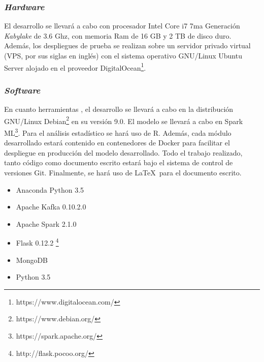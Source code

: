 \subsubsection*{\textit{Hardware}}
El desarrollo se llevará a cabo con procesador Intel Core i7 7ma Generación \textit{Kabylake} de 3.6 Ghz, con memoria Ram de 16 GB y 2 TB de disco duro. Además, los despliegues de prueba se realizan sobre un servidor privado virtual (VPS, por sus siglas en inglés) con el sistema operativo GNU/Linux Ubuntu Server alojado en el proveedor DigitalOcean\footnote{https://www.digitalocean.com/}.

\subsubsection*{\textit{Software}}
En cuanto herramientas , el desarrollo se llevará a cabo en la distribución GNU/Linux Debian\footnote{https://www.debian.org/} en su versión 9.0. El modelo se llevará a cabo en Spark ML\footnote{https://spark.apache.org/}. Para el análisis estadístico se hará uso de R. Además, cada módulo desarrollado estará contenido en contenedores de Docker para facilitar el despliegue en producción del modelo desarrollado. Todo el trabajo realizado, tanto código como documento escrito estará bajo el sistema de control de versiones Git. Finalmente, se hará uso de \LaTeX\ para el documento escrito.

\begin{itemize}
\item Anaconda Python 3.5
\item Apache Kafka 0.10.2.0
\item Apache Spark 2.1.0
\item Flask 0.12.2 \footnote{http://flask.pocoo.org/}
\item MongoDB
\item Python 3.5
\end{itemize}
